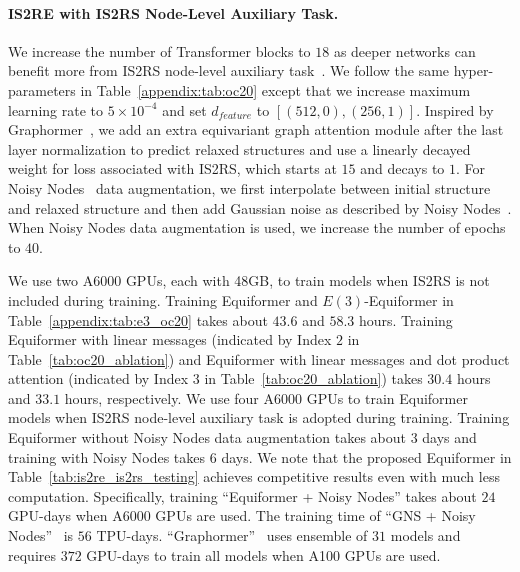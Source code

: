 


\paragraph{IS2RE with IS2RS Node-Level Auxiliary Task.}
We increase the number of Transformer blocks to $18$ as deeper networks can benefit more from IS2RS node-level auxiliary task~\citep{noisy_nodes}.
We follow the same hyper-parameters in Table~\ref{appendix:tab:oc20} except that we increase maximum learning rate to $5 \times 10^{-4}$ and set $d_{feature}$ to $[(512, 0), (256, 1)]$.
Inspired by Graphormer~\citep{graphormer_3d}, we add an extra equivariant graph attention module after the last layer normalization to predict relaxed structures and use a linearly decayed weight for loss associated with IS2RS, which starts at $15$ and decays to $1$.
For Noisy Nodes~\citep{noisy_nodes} data augmentation, we first interpolate between initial structure and relaxed structure and then add Gaussian noise as described by Noisy Nodes~\citep{noisy_nodes}.
When Noisy Nodes data augmentation is used, we increase the number of epochs to $40$.

We use two A6000 GPUs, each with 48GB, to train models when IS2RS is not included during training.
Training Equiformer and $E(3)$-Equiformer in Table~\ref{appendix:tab:e3_oc20} takes about $43.6$ and $58.3$ hours.
Training Equiformer with linear messages (indicated by Index $2$ in Table~\ref{tab:oc20_ablation}) and Equiformer with linear messages and dot product attention (indicated by Index $3$ in Table~\ref{tab:oc20_ablation}) takes $30.4$ hours and $33.1$ hours, respectively.
We use four A6000 GPUs to train Equiformer models when IS2RS node-level auxiliary task is adopted during training.
Training Equiformer without Noisy Nodes data augmentation takes about $3$ days and training with Noisy Nodes takes $6$ days.
We note that the proposed Equiformer in Table~\ref{tab:is2re_is2rs_testing} achieves competitive results even with much less computation.
Specifically, training ``Equiformer + Noisy Nodes'' takes about $24$ GPU-days when A6000 GPUs are used.
The training time of ``GNS + Noisy Nodes''~\citep{noisy_nodes} is $56$ TPU-days.
``Graphormer''~\citep{graphormer_3d} uses ensemble of $31$ models and requires $372$ GPU-days to train all models when A100 GPUs are used.




